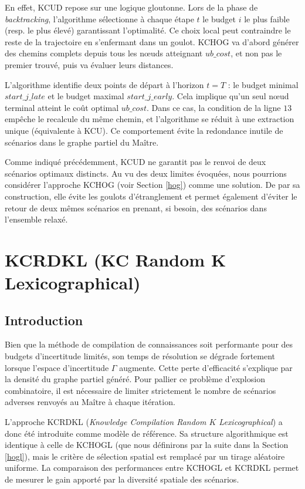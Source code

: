 \documentclass[11pt,a4paper]{article}
\begin{document}
En effet, KCUD repose sur une logique gloutonne. Lors de la phase de \textit{backtracking}, l'algorithme sélectionne à chaque étape $t$ le budget $i$ le plus faible (resp. le plus élevé) garantissant l'optimalité. Ce choix local peut contraindre le reste de la trajectoire en s'enfermant dans un goulot. KCHOG va d'abord générer des chemins complets depuis tous les nœuds atteignant $ub\_cost$, et non pas le premier trouvé, puis va évaluer leurs distances.

L'algorithme identifie deux points de départ à l'horizon $t=T$ : le budget minimal $start\_j\_late$ et le budget maximal $start\_j\_early$. Cela implique qu'un seul nœud terminal atteint le coût optimal $ub\_cost$. Dans ce cas, la condition de la ligne $13$ empêche le recalcule du même chemin, et l'algorithme se réduit à une extraction unique (équivalente à KCU). Ce comportement évite la redondance inutile de scénarios dans le graphe partiel du Maître.

Comme indiqué précédemment, KCUD ne garantit pas le renvoi de deux scénarios optimaux distincts. Au vu des deux limites évoquées, nous pourrions considérer l'approche KCHOG (voir Section \ref{hog}) comme une solution. De par sa construction, elle évite les goulots d'étranglement et permet également d'éviter le retour de deux mêmes scénarios en prenant, si besoin, des scénarios dans l'ensemble relaxé.

\newpage
\section{KCRDKL (KC Random K Lexicographical)}
\label{kcrdk}

\subsection{Introduction}

Bien que la méthode de compilation de connaissances soit performante pour des budgets d'incertitude limités, son temps de résolution se dégrade fortement lorsque l'espace d'incertitude $\Gamma$ augmente. Cette perte d'efficacité s'explique par la densité du graphe partiel généré. Pour pallier ce problème d'explosion combinatoire, il est nécessaire de limiter strictement le nombre de scénarios adverses renvoyés au Maître à chaque itération.

L'approche KCRDKL (\textit{Knowledge Compilation Random $K$ Lexicographical}) a donc été introduite comme modèle de référence. Sa structure algorithmique est identique à celle de KCHOGL (que nous définirons par la suite dans la Section \ref{hogl}), mais le critère de sélection spatial est remplacé par un tirage aléatoire uniforme. La comparaison des performances entre KCHOGL et KCRDKL permet de mesurer le gain apporté par la diversité spatiale des scénarios.
\end{document}
